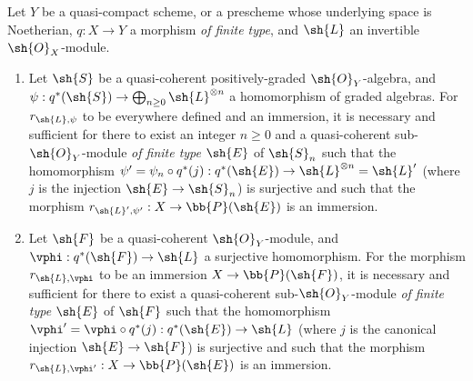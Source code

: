 \begin{proposition}[4.4.1]
\label{II.4.4.1}
Let $Y$ be a quasi-compact scheme, or a prescheme whose underlying space is Noetherian, $q:X\to Y$ a morphism \emph{of finite type}, and $\sh{L}$ an invertible $\sh{O}_X$-module.
\begin{enumerate}
  \item[\rm{(i)}] Let $\sh{S}$ be a quasi-coherent positively-graded $\sh{O}_Y$-algebra, and $\psi:q^*(\sh{S})\to\bigoplus_{n\geq0}\sh{L}^{\otimes n}$ a homomorphism of graded algebras.
    For $r_{\sh{L},\psi}$ to be everywhere defined and an immersion, it is necessary and
    sufficient for there to exist an integer $n\geq0$ and a quasi-coherent sub-$\sh{O}_Y$-module \emph{of finite type} $\sh{E}$ of $\sh{S}_n$ such that the homomorphism $\psi'=\psi_n\circ q^*(j):q^*(\sh{E})\to\sh{L}^{\otimes n}=\sh{L}'$ (where $j$ is the injection $\sh{E}\to\sh{S}_n$) is surjective and such that the morphism $r_{\sh{L}',\psi'}:X\to\bb{P}(\sh{E})$ is an immersion.
  \item[\rm{(ii)}] Let $\sh{F}$ be a quasi-coherent $\sh{O}_Y$-module, and $\vphi:q^*(\sh{F})\to\sh{L}$ a surjective homomorphism.
    For the morphism $r_{\sh{L},\vphi}$ to be an immersion $X\to\bb{P}(\sh{F})$, it is necessary and sufficient for there to exist a quasi-coherent sub-$\sh{O}_Y$-module \emph{of finite type} $\sh{E}$ of $\sh{F}$ such that the homomorphism $\vphi'=\vphi\circ q^*(j):q^*(\sh{E})\to\sh{L}$ (where $j$ is the canonical injection $\sh{E}\to\sh{F}$) is surjective and such that the morphism $r_{\sh{L},\vphi'}:X\to\bb{P}(\sh{E})$ is an immersion.
\end{enumerate}
\end{proposition}

